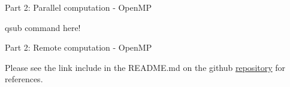 \documentclass[11pt, twoside]{article}
\begin{document}
\noindent



\begin{center}
	\color{MidnightBlue} {\Large Part 2: Parallel computation - OpenMP }\color{Black} 
\end{center}


qsub command here!

\begin{center}
	\color{MidnightBlue} {\Large Part 2: Remote computation - OpenMP }\color{Black} 
\end{center}






\vspace{1cm}
\noindent
Please see the link include in the README.md on the github \href{https://github.com/SebastianoF/game_of_life}{repository} for references.
\end{document}
